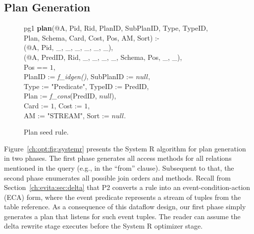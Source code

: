 \subsection{Plan Generation}
\label{ch:opt:sec:plangen}

\begin{figure*}
\ssp
\centering
\begin{boxedminipage}{\linewidth}
pg1 {\bf plan}(@A, Pid, Rid, PlanID, SubPlanID, Type, TypeID, \\
\datalogspace \xspace \xspace Plan, Schema, Card, Cost, Pos, AM, Sort) :- \\
(@A, Pid, \_, \_, \_, \_, \_, \_),\\
(@A, PredID, Rid, \_, \_, \_, \_, Schema, Pos, \_, \_),\\
\datalogspace Pos == $1$,\\
\datalogspace PlanID := {\em f\_idgen()}, SubPlanID := $null$,\\
\datalogspace Type := "Predicate", TypeID := PredID,\\
\datalogspace Plan := {\em f\_cons}(PredID, $null$),\\
\datalogspace Card := $1$, Cost := $1$,\\
\datalogspace AM := "STREAM", Sort := $null$.
\end{boxedminipage}
\caption{\label{ch:opt:fig:planseed}Plan seed rule.}
\end{figure*}

Figure~\ref{ch:opt:fig:systemr} presents the System R algorithm for plan
generation in two phases.  The first phase generates all access methods for all
relations mentioned in the query (e.g., in the ``from'' clause).  Subsequent to
that, the second phase enumerates all possible join orders and methods.  Recall
from Section~\ref{ch:evita:sec:delta} that P2 converts a rule into an
event-condition-action (ECA) form, where the event predicate represents a
stream of tuples from the table reference.  As a consequence of this dataflow
design, our first phase simply generates a plan that listens for such event
tuples.  The reader can assume the delta rewrite stage executes before the
System R optimizer stage.  

